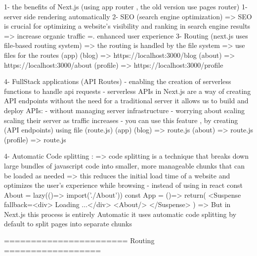 1- the benefits of Next.js  (using app router , the old version use pages router)
        1- server side rendering automatically
        2- SEO (search engine optimization) => SEO is crucial for optimizing a website's visibility and ranking in search engine results
                => increase organic traffic
                =. enhanced user experience
        3- Routing (next.js uses file-based routing system)
                => the routing is handled by the file system
                => use files for the routes 
                (app)
                    (blog) => https://localhost:3000/blog
                    (about) => https://localhost:3000/about
                    (profile) => https://localhost:3000/profile

        4- FullStack applications (API Routes)
            - enabling the creation of serverless functions to handle api requests
            - serverless APIs in Next.js are a way of creating API endpoints without the need for a traditional server 
                it allows us to build and deploy APIs:
                        - without managing server infrastructure
                        - worrying about scaling scaling their server as traffic increases
            - you can use this feature , by creating (API endpoints) using file (route.js)
                    (app)
                        (blog) => route.js
                        (about) => route.js
                        (profile) => route.js

        4- Automatic Code splitting :
                => code splitting is a technique that breaks down large bundles of javascript code into smaller,
                    more manageable chunks that can be loaded as needed
                => this reduces the initial load time of a website and optimizes the user's experience while browsing
                    - instead of using in react 
                            const About = lazy(()=> import('./About'))
                            const App = ()=> {
                                return(
                                    <Suspense fallback={<div> Loading ...</div>}
                                        <About/>
                                    </Suspense>
                                )
                            }
                => But in Next.js this process is entirely Automatic
                    it uses automatic code splitting by default to split pages into separate chunks

======================= Routing    ==================


